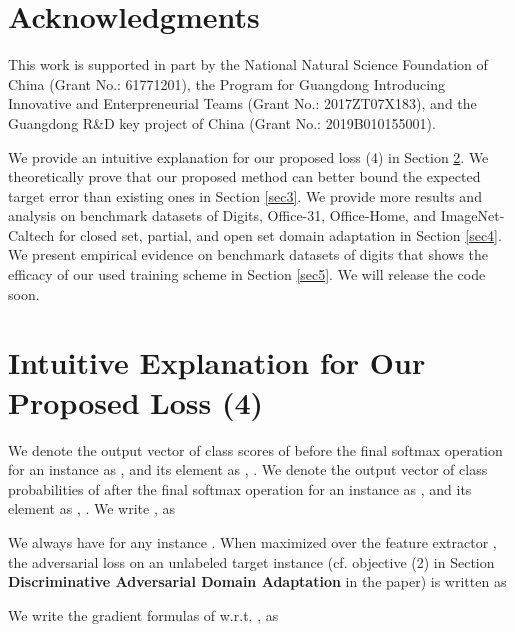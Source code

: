 \documentclass[letterpaper]{article} \usepackage{aaai20}  \usepackage{times}  \usepackage{helvet} \usepackage{courier}  \usepackage[hyphens]{url}  \usepackage{graphicx} \urlstyle{rm} \def\UrlFont{\rm}  \usepackage{graphicx}  \frenchspacing  \setlength{\pdfpagewidth}{8.5in}  \setlength{\pdfpageheight}{11in}
\begin{document}
\section{Acknowledgments}
This work is supported in part by the National Natural Science Foundation of China (Grant No.: 61771201), the Program for Guangdong Introducing Innovative and Enterpreneurial Teams (Grant No.: 2017ZT07X183), and the Guangdong R\&D key project of China (Grant No.: 2019B010155001).

\fontsize{9.0pt}{10.0pt} \selectfont 


\clearpage

\appendix

\newtheorem{proposition}{Proposition}
\newtheorem{theorem}{Theorem}
\newtheorem{definition}{Definition}


\setcounter{secnumdepth}{2}

We provide an intuitive explanation for our proposed loss (4) in Section \ref{sec2}. We theoretically prove that our proposed method can better bound the expected target error than existing ones in Section \ref{sec3}. We provide more results and analysis on benchmark datasets of Digits, Office-31, Office-Home, and ImageNet-Caltech for closed set, partial, and open set domain adaptation in Section \ref{sec4}. We present empirical evidence on benchmark datasets of digits that shows the efficacy of our used training scheme in Section \ref{sec5}. We will release the code soon.

\section{Intuitive Explanation for Our Proposed Loss (4)}
\label{sec2}
We denote the output vector of class scores of  before the final softmax operation for an instance  as , and its  element as , . We denote the output vector of class probabilities of  after the final softmax operation for an instance  as , and its  element as , . We write ,  as 

We always have  for any instance . When maximized over the feature extractor , the adversarial loss on an unlabeled target instance  (cf. objective (2) in Section \textbf{Discriminative Adversarial Domain Adaptation} in the paper) is written as 

We write the gradient formulas of  w.r.t. ,  as 
\end{document}

